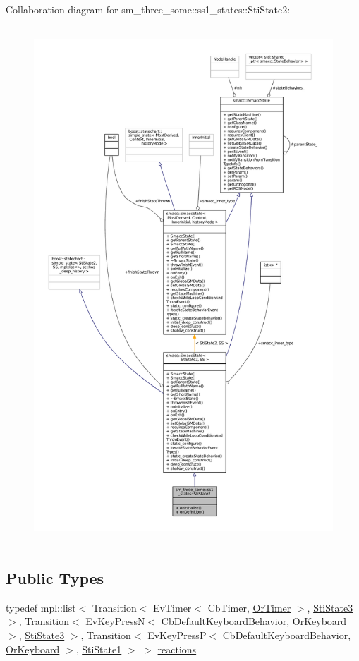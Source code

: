 Collaboration diagram for sm\+\_\+three\+\_\+some\+:\+:ss1\+\_\+states\+:\+:Sti\+State2\+:
\nopagebreak
\begin{figure}[H]
\begin{center}
\leavevmode
\includegraphics[height=550pt]{structsm__three__some_1_1ss1__states_1_1StiState2__coll__graph}
\end{center}
\end{figure}
\subsection*{Public Types}
\begin{DoxyCompactItemize}
\item 
typedef mpl\+::list$<$ Transition$<$ Ev\+Timer$<$ Cb\+Timer, \hyperlink{classsm__three__some_1_1OrTimer}{Or\+Timer} $>$, \hyperlink{structsm__three__some_1_1ss1__states_1_1StiState3}{Sti\+State3} $>$, Transition$<$ Ev\+Key\+PressN$<$ Cb\+Default\+Keyboard\+Behavior, \hyperlink{classsm__three__some_1_1OrKeyboard}{Or\+Keyboard} $>$, \hyperlink{structsm__three__some_1_1ss1__states_1_1StiState3}{Sti\+State3} $>$, Transition$<$ Ev\+Key\+PressP$<$ Cb\+Default\+Keyboard\+Behavior, \hyperlink{classsm__three__some_1_1OrKeyboard}{Or\+Keyboard} $>$, \hyperlink{structsm__three__some_1_1ss1__states_1_1StiState1}{Sti\+State1} $>$ $>$ \hyperlink{structsm__three__some_1_1ss1__states_1_1StiState2_a3a6dd1b1f9cf7033bbb6e0c6bbc76f5c}{reactions}
\end{DoxyCompactItemize}
